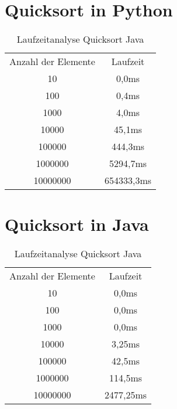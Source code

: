 \chapter{Quicksort in Python}
\label{quicksort:python}

\begin{table}[H]
    \centering
    \begin{tabular}{|c|c|}
        \hline
        Anzahl der Elemente & Laufzeit \\
        10 & 0,0ms \\
        100 & 0,4ms \\
        1000 & 4,0ms \\
        10000 & 45,1ms \\
        100000 & 444,3ms \\
        1000000 & 5294,7ms \\
        10000000 & 654333,3ms \\
        \hline
    \end{tabular}
    \caption{Laufzeitanalyse Quicksort Java}
    \label{tab:python_laufzeit}
\end{table}

\chapter{Quicksort in Java}
\label{quicksort:java}

\begin{table}[H]
    \centering
    \begin{tabular}{|c|c|}
        \hline
        Anzahl der Elemente & Laufzeit \\
        10 & 0,0ms \\
        100 & 0,0ms \\
        1000 & 0,0ms \\
        10000 & 3,25ms \\
        100000 & 42,5ms \\
        1000000 & 114,5ms \\
        10000000 & 2477,25ms \\
        \hline
    \end{tabular}
    \caption{Laufzeitanalyse Quicksort Java}
    \label{tab:java_laufzeit}
\end{table}
